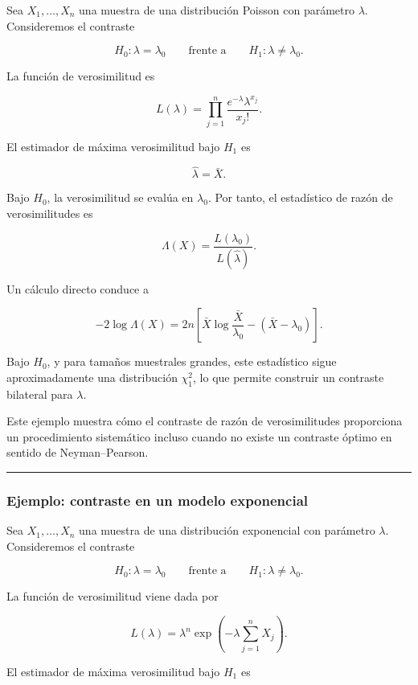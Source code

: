 \documentclass[
]{article}
\begin{document}
Sea \(X_1,\dots,X_n\) una muestra de una distribución Poisson con parámetro \(\lambda\). Consideremos el contraste

\[
H_0:\lambda=\lambda_0
\qquad \text{frente a} \qquad
H_1:\lambda\neq\lambda_0.
\]

La función de verosimilitud es

\[
L(\lambda)=\prod_{j=1}^n \frac{e^{-\lambda}\lambda^{x_j}}{x_j!}.
\]

El estimador de máxima verosimilitud bajo \(H_1\) es

\[
\hat\lambda=\bar X.
\]

Bajo \(H_0\), la verosimilitud se evalúa en \(\lambda_0\). Por tanto, el estadístico de razón de verosimilitudes es

\[
\Lambda(X)
=
\frac{L(\lambda_0)}{L(\hat\lambda)}.
\]

Un cálculo directo conduce a

\[
-2\log\Lambda(X)
=
2n\left[
\bar X\log\frac{\bar X}{\lambda_0}
-(\bar X-\lambda_0)
\right].
\]

Bajo \(H_0\), y para tamaños muestrales grandes, este estadístico sigue aproximadamente una distribución \(\chi^2_1\), lo que permite construir un contraste bilateral para \(\lambda\).

Este ejemplo muestra cómo el contraste de razón de verosimilitudes proporciona un procedimiento sistemático incluso cuando no existe un contraste óptimo en sentido de Neyman--Pearson.

\begin{center}\rule{0.5\linewidth}{0.5pt}\end{center}

\subsubsection{Ejemplo: contraste en un modelo exponencial}\label{ejemplo-contraste-en-un-modelo-exponencial}

Sea \(X_1,\dots,X_n\) una muestra de una distribución exponencial con parámetro \(\lambda\). Consideremos el contraste

\[
H_0:\lambda=\lambda_0
\qquad \text{frente a} \qquad
H_1:\lambda\neq\lambda_0.
\]

La función de verosimilitud viene dada por

\[
L(\lambda)=\lambda^n\exp\!\left(-\lambda\sum_{j=1}^n X_j\right).
\]

El estimador de máxima verosimilitud bajo \(H_1\) es
\end{document}

